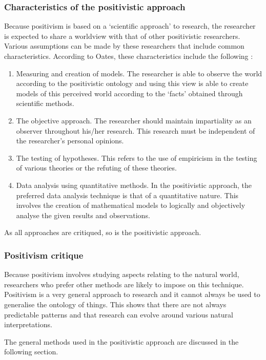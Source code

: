 \subsubsection{Characteristics of the positivistic approach}
Because positivism is based on a ‘scientific approach’ to research, the researcher is expected to share a worldview with that of other positivistic researchers. Various assumptions can be made by these researchers that include common characteristics. According to Oates, these characteristics include the following \citep{OatesJ2006}: 
\begin{enumerate}[label=\roman*.]
	\item Measuring and creation of models. The researcher is able to observe the world according to the positivistic ontology and using this view is able to create models of this perceived world according to the ‘facts’ obtained through scientific methods.
	\item The objective approach. The researcher should maintain impartiality as an observer throughout his/her research. This research must be independent of the researcher’s personal opinions.
	\item The testing of hypotheses. This refers to the use of empiricism in the testing of various theories or the refuting of these theories.
	\item Data analysis using quantitative methods. In the positivistic approach, the preferred data analysis technique is that of a quantitative nature. This involves the creation of mathematical models to logically and objectively analyse the given results and observations.
\end{enumerate}

As all approaches are critiqued, so is the positivistic approach. 

\subsubsection{Positivism critique}
Because positivism involves studying aspects relating to the natural world, researchers who prefer other methods are likely to impose on this technique. Positivism is a very general approach to research and it cannot always be used to generalise the ontology of things. This shows that there are not always predictable patterns and that research can evolve around various natural interpretations.

The general methods used in the positivistic approach are discussed in the following section.

